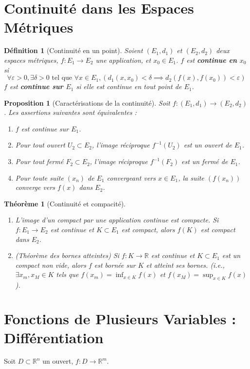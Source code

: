 \documentclass[a4paper]{article}
\newcommand{\R}{\mathbb{R}}
\newtheorem{theorem}{Théorème}[section]
\newtheorem{definition}{Définition}[section]
\newtheorem{proposition}{Proposition}[section]
\begin{document}
\section{Continuité dans les Espaces Métriques}
\begin{definition}[Continuité en un point]
    Soient \((E_1, d_1)\) et \((E_2, d_2)\) deux espaces métriques, \(f: E_1 \to E_2\) une application, et \(x_0 \in E_1\).
    \(f\) est \textbf{continue en \(x_0\)} si
    \[ \forall \varepsilon > 0, \exists \delta > 0 \text{ tel que } \forall x \in E_1, (d_1(x,x_0) < \delta \implies d_2(f(x), f(x_0)) < \varepsilon) \]
    \(f\) est \textbf{continue sur \(E_1\)} si elle est continue en tout point de \(E_1\).
\end{definition}
\begin{proposition}[Caractérisations de la continuité]
   Soit \(f: (E_1, d_1) \to (E_2, d_2)\). Les assertions suivantes sont équivalentes :
   \begin{enumerate}
       \item \(f\) est continue sur \(E_1\).
       \item Pour tout ouvert \(U_2 \subset E_2\), l'image réciproque \(f^{-1}(U_2)\) est un ouvert de \(E_1\).
       \item Pour tout fermé \(F_2 \subset E_2\), l'image réciproque \(f^{-1}(F_2)\) est un fermé de \(E_1\).
       \item Pour toute suite \((x_n)\) de \(E_1\) convergeant vers \(x \in E_1\), la suite \((f(x_n))\) converge vers \(f(x)\) dans \(E_2\).
   \end{enumerate}
\end{proposition}
\begin{theorem}[Continuité et compacité]
    \begin{enumerate}
        \item L'image d'un compact par une application continue est compacte.
        Si \(f: E_1 \to E_2\) est continue et \(K \subset E_1\) est compact, alors \(f(K)\) est compact dans \(E_2\).
        \item (Théorème des bornes atteintes) Si \(f: K \to \R\) est continue et \(K \subset E_1\) est un compact non vide, alors \(f\) est bornée sur \(K\) et atteint ses bornes.
        (i.e., \(\exists x_m, x_M \in K\) tels que \(f(x_m) = \inf_{x \in K} f(x)\) et \(f(x_M) = \sup_{x \in K} f(x)\)).
    \end{enumerate}
\end{theorem}

\section{Fonctions de Plusieurs Variables : Différentiation}
Soit \(D \subset \R^n\) un ouvert, \(f: D \to \R^m\).
\end{document}
